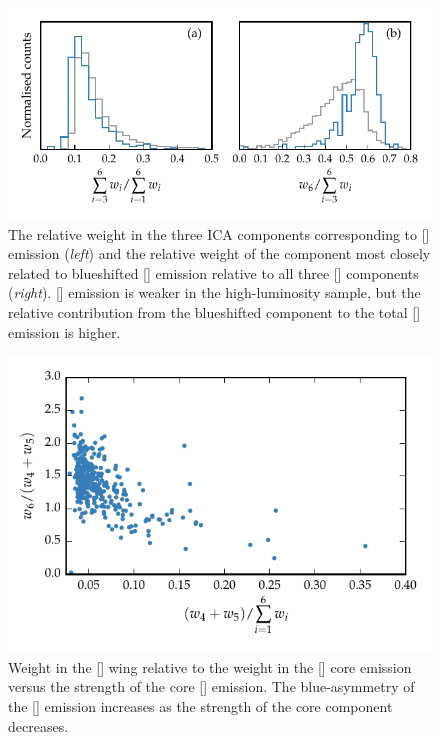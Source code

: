 \begin{figure}
    \centering
    \includegraphics[width=\textwidth]{figures/chapter04/mfica_oiii_weight.pdf} 
    \caption{The relative weight in the three \ac{ICA} components corresponding to [] emission ({\em left}) and the relative weight of the component most closely related to blueshifted [] emission relative to all three [] components ({\em right}). [] emission is weaker in the high-luminosity sample, but the relative contribution from the blueshifted component to the total [] emission is higher.}     
    \label{fig:mfica_oiii_weight}
\end{figure}

\begin{figure}
    \centering
    \includegraphics[width=\columnwidth]{figures/chapter04/oiii_core_strength_blueshift.pdf} 
    \caption{Weight in the [] wing relative to the weight in the [] core emission versus the strength of the core [] emission. The blue-asymmetry of the [] emission increases as the strength of the core component decreases.}     
    \label{fig:oiii_core_strength_blueshift}
\end{figure}

